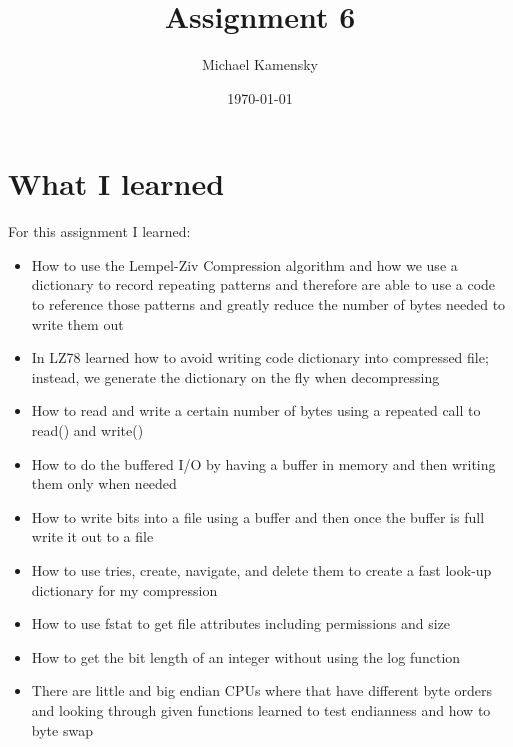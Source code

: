 \documentclass[11pt]{article} %
\title{Assignment 6}
\author{Michael Kamensky}
\date{\today} %
\begin{document}
\maketitle %
\section{What I learned}
For this assignment I learned:
\begin{itemize}
\item How to use the Lempel-Ziv Compression algorithm and how we use a dictionary to record repeating patterns and therefore are able to use a code to reference those patterns and greatly reduce the number of bytes needed to write them out
\item In LZ78 learned how to avoid writing code dictionary into compressed file; instead, we generate the dictionary on the fly when decompressing
\item How to read and write a certain number of bytes using a repeated call to read() and write()
\item How to do the buffered I/O by having a buffer in memory and then writing them only when needed
\item How to write bits into a file using a buffer and then once the buffer is full write it out to a file
\item How to use tries, create, navigate, and delete them to create a fast look-up dictionary for my compression 
\item How to use fstat to get file attributes including permissions and size
\item How to get the bit length of an integer without using the log function
\item There are little and big endian CPUs where that have different byte orders and looking through given functions learned to test endianness and how to byte swap
\end{itemize}
\end{document}
